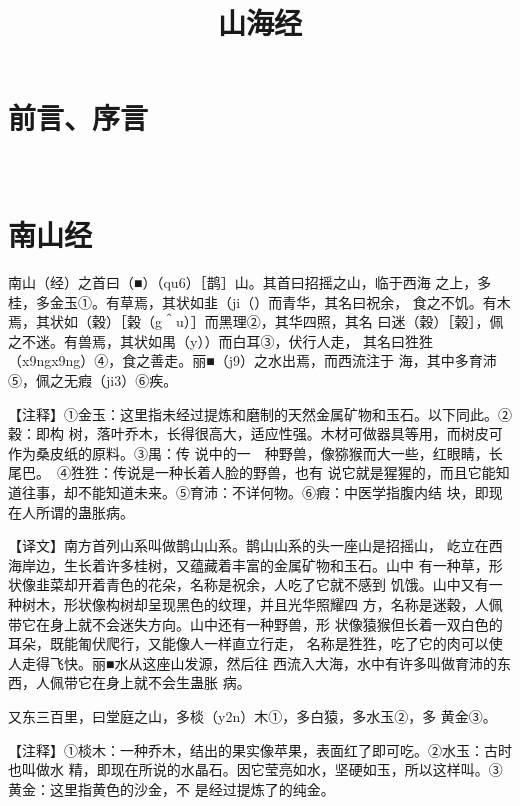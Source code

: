 \documentclass[a4paper,12pt,UTF8,twoside]{ctexbook}
\title{\heiti\zihao{0} 山海经}
\author{}
\date{}
\begin{document}
\maketitle
\tableofcontents

\frontmatter
\chapter{前言、序言}

\mainmatter

~\\

 \qquad  

\chapter{南山经}

南山（经）之首曰（■）（qu6）［鹊］山。其首曰招摇之山，临于西海 之上，多桂，多金玉①。有草焉，其状如韭（ji（）而青华，其名曰祝余， 食之不饥。有木焉，其状如（穀）［榖（g＾u）］而黑理②，其华四照，其名 曰迷（穀）［榖］，佩之不迷。有兽焉，其状如禺（y））而白耳③，伏行人走， 其名曰狌狌（x9ngx9ng）④，食之善走。丽■（j9）之水出焉，而西流注于 海，其中多育沛⑤，佩之无瘕（ji3）⑥疾。

【注释】①金玉：这里指未经过提炼和磨制的天然金属矿物和玉石。以下同此。②穀：即构 树，落叶乔木，长得很高大，适应性强。木材可做器具等用，而树皮可作为桑皮纸的原料。③禺：传 说中的一　种野兽，像猕猴而大一些，红眼睛，长尾巴。　④狌狌：传说是一种长着人脸的野兽，也有 说它就是猩猩的，而且它能知道往事，却不能知道未来。⑤育沛：不详何物。⑥瘕：中医学指腹内结 块，即现在人所谓的蛊胀病。

【译文】南方首列山系叫做鹊山山系。鹊山山系的头一座山是招摇山， 屹立在西海岸边，生长着许多桂树，又蕴藏着丰富的金属矿物和玉石。山中 有一种草，形状像韭菜却开着青色的花朵，名称是祝余，人吃了它就不感到 饥饿。山中又有一种树木，形状像构树却呈现黑色的纹理，并且光华照耀四 方，名称是迷穀，人佩带它在身上就不会迷失方向。山中还有一种野兽，形 状像猿猴但长着一双白色的耳朵，既能匍伏爬行，又能像人一样直立行走， 名称是狌狌，吃了它的肉可以使人走得飞快。丽■水从这座山发源，然后往 西流入大海，水中有许多叫做育沛的东西，人佩带它在身上就不会生蛊胀 病。

又东三百里，曰堂庭之山，多棪（y2n）木①，多白猿，多水玉②，多 黄金③。

【注释】①棪木：一种乔木，结出的果实像苹果，表面红了即可吃。②水玉：古时也叫做水 精，即现在所说的水晶石。因它莹亮如水，坚硬如玉，所以这样叫。③黄金：这里指黄色的沙金，不 是经过提炼了的纯金。
\end{document}
